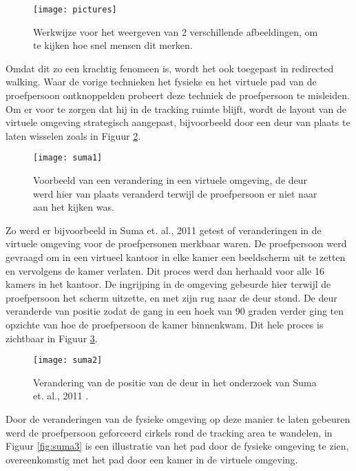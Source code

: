 \begin{figure}[t!]
    \centering
    \texttt{[image: pictures]}
    \caption{Werkwijze voor het weergeven van 2 verschillende afbeeldingen, om te 
    kijken hoe snel mensen dit merken.\cite{rensink97}}
    \label{fig:pictures}
\end{figure}

Omdat dit zo een krachtig fenomeen is, wordt het ook toegepast in redirected 
walking. Waar de vorige technieken het fysieke en het virtuele pad van de 
proefpersoon ontknoppelden probeert deze techniek de proefpersoon te misleiden. 
Om er voor te zorgen dat hij in de tracking ruimte blijft, wordt de layout van de 
virtuele omgeving strategisch aangepast, bijvoorbeeld door een deur van
plaats te laten wisselen zoals in Figuur \ref{fig:suma1}.

\begin{figure}[t!]
    \centering
    \texttt{[image: suma1]}
    \caption{Voorbeeld van een verandering in een virtuele omgeving, de deur
    werd hier van plaats veranderd terwijl de proefpersoon er niet naar aan het
    kijken was.\cite{suma11}}
    \label{fig:suma1}
\end{figure}

Zo werd er bijvoorbeeld in Suma et. al., 2011 \cite{suma11} getest of 
veranderingen in de virtuele omgeving voor de proefpersonen merkbaar waren. 
De proefpersoon werd gevraagd om in een virtueel kantoor in elke kamer een 
beeldscherm uit te zetten en vervolgens de kamer verlaten. Dit proces werd dan 
herhaald voor alle 16 kamers in het kantoor. De ingrijping in de omgeving
gebeurde hier terwijl de proefpersoon het scherm uitzette, en met zijn rug naar
de deur stond. De deur veranderde van positie zodat de gang in een hoek van 90 
graden verder ging ten opzichte van hoe de proefpersoon de kamer binnenkwam. 
Dit hele proces is zichtbaar in Figuur \ref{fig:suma2}.

\begin{figure}[t!]
    \centering
    \texttt{[image: suma2]}
    \caption{Verandering van de positie van de deur in het onderzoek van Suma et. 
    al., 2011 \cite{suma11}.}
    \label{fig:suma2}
\end{figure}

Door de veranderingen van de fysieke omgeving op deze manier te laten gebeuren
werd de proefpersoon geforceerd cirkels rond de tracking area te wandelen, in
Figuur \ref{fig:suma3} is een illustratie van het pad door de fysieke omgeving te
zien, overeenkomstig met het pad door een kamer in de virtuele omgeving.

